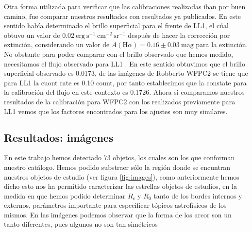 \documentclass{article}
\newcommand\ha{\ensuremath{\mathrm{H}\alpha}}
\begin{document}
Otra forma utilizada para verificar que las calibraciones realizadas iban por buen camino, fue comparar nuestros resultados con  resultados ya publicados. En este sentido \citet{Henney:2013a} había determinado el brillo superficial para el frente de LL1, el cúal obtuvo un valor de \(0.02\ \mathrm{erg\ s^{-1}\ cm^{-2}\ sr^{-1}}\) después de hacer la corrección por extinción, considerando un valor de \(A(\ha{}) = 0.16 \pm 0.03\ \text{mag}\) para la extinción. No obstante para poder comparar con el brillo observado que hemos medido, necesitamos el flujo observado para  LL1 . En este sentido obtuvimos que el brillo superficial observado es 0.0173, de las imágenes de Robberto WFPC2 se tiene que para LL1 la  cuont rate es 0.10 count, por tanto establecimos que la constate para la calibración del flujo en este contexto es 0.1726. Ahora si comparamos nuestros resultados de la calibración para WFPC2 con los realizados previamente para LL1 vemos que los factores encontrados para los ajustes son muy similares.   


\subsection{Resultados: imágenes}
\label{sec:images}
En este trabajo hemos detectado 73 objetos, los cuales son los que conforman nuestro catálogo. Hemos podido substraer sólo la región donde se encuntran nuestros objetos de estudio (ver figura \ref{fig:images}), como anteriormente hemos dicho esto nos ha permitido caracterizar las estrellas objetos de estudios, en la medida en que hemos podido determinar \(R_{c}\) y \(R_{0}\) tanto de los bordes internos y externos, parámetros importante para especificar tópicos astrofísicos de los mismos. En las imágenes podemos observar que la forma de los arcor son un tanto diferentes, pues algunos no son tan simétricos  
\end{document}
